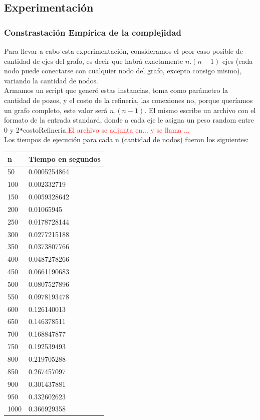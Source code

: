 \newpage
\subsection{Experimentaci\'on}
\subsubsection{Constrastaci\'on Emp\'irica de la complejidad}
	Para llevar a cabo esta experimentaci\'on, consideramos el peor caso posible de cantidad de ejes del grafo, es decir que habr\'a exactamente $n.(n-1)$ ejes (cada nodo puede conectarse con cualquier nodo del grafo, excepto consigo mismo), variando la cantidad de nodos.\\


	Armamos un script que gener\'o estas instancias, toma como par\'ametro la cantidad de pozos, y el costo de la refiner\'ia, las conexiones no, porque quer\'iamos un grafo completo, este valor ser\'a $n.(n-1)$. El mismo escribe un archivo con el formato de la entrada standard, donde a cada eje le asigna un peso random entre 0 y 2\texttt{*}costoRefiner\'ia.\textcolor{red}{El archivo se adjunta en... y se llama ...}\\

	Los tiempos de ejecuci\'on para cada n (cantidad de nodos) fueron los siguientes:

	\begin{table}[htb]
	\centering
	\begin{tabular}[c]{|l|l|}

		\hline
n & Tiempo en segundos\\
		\hline
50	&	0.0005254864\\
		\hline
100	&	0.002332719\\
		\hline
150	&	0.0059328642\\
		\hline
200	&	0.01065945\\
		\hline
250	&	0.0178728144\\
		\hline
300	&	0.0277215188\\
		\hline
350	&	0.0373807766\\
		\hline
400	&	0.0487278266\\
		\hline
450	&	0.0661190683\\
		\hline
500	&	0.0807527896\\
		\hline
550	&	0.0978193478\\
		\hline
600	&	0.126140013\\
		\hline
650	&	0.146378511\\
		\hline
700	&	0.168847877\\
		\hline
750	&	0.192539493\\
		\hline
800	&	0.219705288\\
		\hline
850	&	0.267457097\\
		\hline
900	&	0.301437881\\
		\hline
950	&	0.332602623\\
		\hline
1000	&	0.366929358\\
		\hline

	\end{tabular}
	\end{table}

